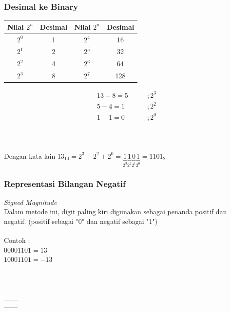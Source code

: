 \documentclass{beamer}
\begin{document}
\begin{frame}
\frametitle{Desimal ke Binary}
\begin{center}
\begin{tabular}{|c|c|c|c|}
\hline
	Nilai $2^n$ & Desimal & Nilai $2^n$ & Desimal\\
\hline
	$2^0$ & 1 & $2^4$ & 16\\
\hline
	$2^1$ & 2 & $2^5$ & 32\\
\hline
	$2^2$ & 4 & $2^6$ & 64\\
\hline
	$2^3$ & 8 & $2^7$ & 128\\
\hline
\end{tabular}
\end{center}
\begin{equation}
\begin{split}
13 - \boxed{8} = 5 &\qquad ;2^3
\\5 - \boxed{4} = 1 &\qquad ;2^2
\\1 - \boxed{1} = 0  &\qquad ;2^0
\end{split}
\nonumber
\end{equation}
\ \\\ \\\ \\Dengan kata lain $13_{10} = 2^3 + 2^2 + 2^0 = \underbrace{1}_{2^3} \underbrace{1}_{2^2} \underbrace{0}_{2^1} \underbrace{1}_{2^0} = 1101_2$
\end{frame}



\begin{frame}
\frametitle{Representasi Bilangan Negatif}
\textit{Signed Magnitude}
\\Dalam metode ini, digit paling kiri digunakan sebagai penanda positif dan negatif. (positif sebagai "0" dan negatif sebagai "1")
\\\ \\Contoh :
\\$00001101 = 13$
\\$10001101 = -13$
\\\ \\\ 
\\\ \\\begin{tabular}{cc}
	&\\
	&\\
	&\\
\end{tabular} 


\end{frame}
\end{document}
